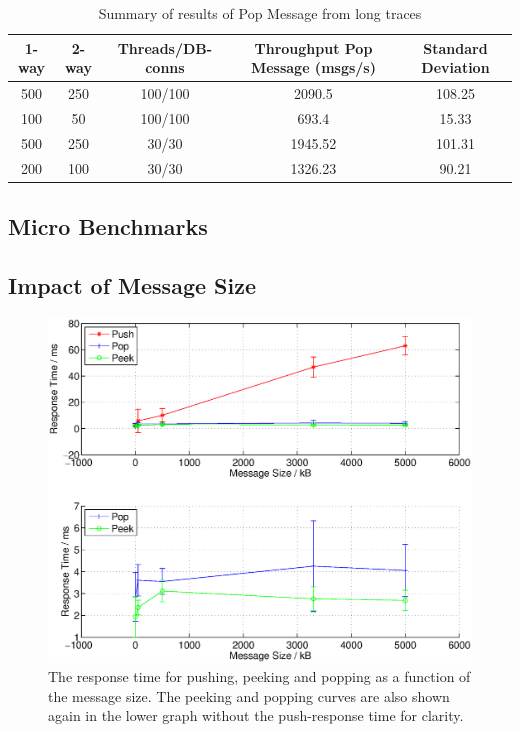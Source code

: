 \documentclass{article}
\begin{document}
            \begin{table}[H]
                \label{table:long_trace_test_summary_popmessage}
                \caption{Summary of results of Pop Message from long traces}
                \begin{tabular}{|c|c|c|c|c|}
                    \hline 
                    \textbf{1-way} & \textbf{2-way} & \textbf{Threads/DB-conns} & \textbf{Throughput Pop Message (msgs/s)} & \textbf{Standard Deviation} \\ 
                    \hline 
                    500 & 250 & 100/100 &2090.5 &108.25\\
                    \hline
                    100 & 50 & 100/100 &693.4 &15.33\\
                    \hline 
                    500 & 250 & 30/30 &1945.52 &101.31\\
                    \hline
                    200 & 100 & 30/30 &1326.23 &90.21\\
                    \hline
                \end{tabular} 
            \end{table}

        \subsection{Micro Benchmarks}
        \subsection{Impact of Message Size}
        
        \begin{figure}[H]
                \hspace{-1.5cm}
                \includegraphics[scale=0.60]{responsetime_msgsize}
                \caption{The response time for pushing, peeking and popping as a function of the message size. The peeking and popping curves are also shown again in the lower graph without the push-response time for clarity.}
                \label{fig:responsetime_msgsize}
            \end{figure}
\end{document}
